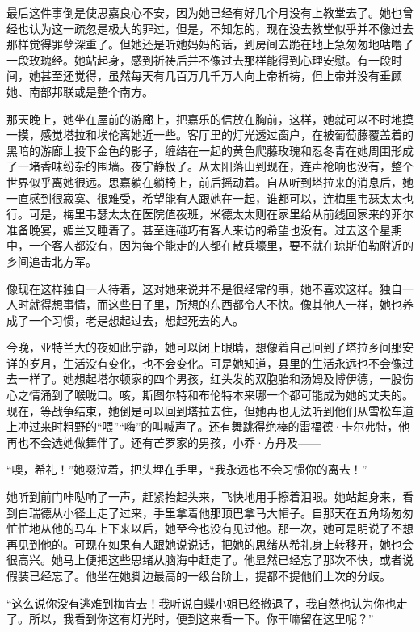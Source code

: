 \par 最后这件事倒是使思嘉良心不安，因为她已经有好几个月没有上教堂去了。她也曾经也认为这一疏忽是极大的罪过，但是，不知怎的，现在没去教堂似乎并不像过去那样觉得罪孽深重了。但她还是听她妈妈的话，到房间去跪在地上急匆匆地咕噜了一段玫瑰经。她站起身，感到祈祷后并不像过去那样能得到心理安慰。有一段时间，她甚至还觉得，虽然每天有几百万几千万人向上帝祈祷，但上帝并没有垂顾她、南部邦联或是整个南方。
\par 那天晚上，她坐在屋前的游廊上，把嘉乐的信放在胸前，这样，她就可以不时地摸一摸，感觉塔拉和埃伦离她近一些。客厅里的灯光透过窗户，在被葡萄藤覆盖着的黑暗的游廊上投下金色的影子，缠结在一起的黄色爬藤玫瑰和忍冬青在她周围形成了一堵香味纷杂的围墙。夜宁静极了。从太阳落山到现在，连声枪响也没有，整个世界似乎离她很远。思嘉躺在躺椅上，前后摇动着。自从听到塔拉来的消息后，她一直感到很寂寞、很难受，希望能有人跟她在一起，谁都可以，连梅里韦瑟太太也行。可是，梅里韦瑟太太在医院值夜班，米德太太则在家里给从前线回家来的菲尔准备晚宴，媚兰又睡着了。甚至连碰巧有客人来访的希望也没有。过去这个星期中，一个客人都没有，因为每个能走的人都在散兵壕里，要不就在琼斯伯勒附近的乡间追击北方军。
\par 像现在这样独自一人待着，这对她来说并不是很经常的事，她不喜欢这样。独自一人时就得想事情，而这些日子里，所想的东西都令人不快。像其他人一样，她也养成了一个习惯，老是想起过去，想起死去的人。
\par 今晚，亚特兰大的夜如此宁静，她可以闭上眼睛，想像着自己回到了塔拉乡间那安详的岁月，生活没有变化，也不会变化。可是她知道，县里的生活永远也不会像过去一样了。她想起塔尔顿家的四个男孩，红头发的双胞胎和汤姆及博伊德，一股伤心之情涌到了喉咙口。咳，斯图尔特和布伦特本来哪一个都可能成为她的丈夫的。现在，等战争结束，她倒是可以回到塔拉去住，但她再也无法听到他们从雪松车道上冲过来时粗野的“喂”“嗨”的叫喊声了。还有舞跳得绝棒的雷福德·卡尔弗特，他再也不会选她做舞伴了。还有芒罗家的男孩，小乔·方丹及——
\par “噢，希礼！”她啜泣着，把头埋在手里，“我永远也不会习惯你的离去！”
\par 她听到前门咔哒响了一声，赶紧抬起头来，飞快地用手擦着泪眼。她站起身来，看到白瑞德从小径上走了过来，手里拿着他那顶巴拿马大帽子。自那天在五角场匆匆忙忙地从他的马车上下来以后，她至今也没有见过他。那一次，她可是明说了不想再见到他的。可现在如果有人跟她说说话，把她的思绪从希礼身上转移开，她也会很高兴。她马上便把这些思绪从脑海中赶走了。他显然已经忘了那次不快，或者说假装已经忘了。他坐在她脚边最高的一级台阶上，提都不提他们上次的分歧。
\par “这么说你没有逃难到梅肯去！我听说白蝶小姐已经撤退了，我自然也认为你也走了。所以，我看到你这有灯光时，便到这来看一下。你干嘛留在这里呢？”
